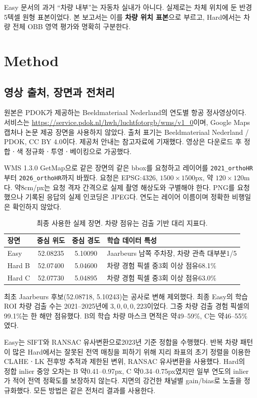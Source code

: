 \documentclass[11pt,a4paper]{article}
\begin{document}
Easy 문서의 과거 ``차량 내부''는 자동차 실내가 아니다. 실제로는 차체 위치에 둔 반경5텍셀 원형 표본이었다. 본 보고서는 이를 \textbf{차량 위치 표본}으로 부르고, Hard에서는 차량 전체 OBB 영역 평가와 명확히 구분한다.

\section{Method}
\subsection{영상 출처, 장면과 전처리}
원본은 PDOK가 제공하는 Beeldmateriaal Nederland의 연도별 항공 정사영상이다. 서비스는
\url{https://service.pdok.nl/hwh/luchtfotorgb/wms/v1_0}이며, Google Maps 캡처나 논문 제공 장면을 사용하지 않았다. 출처 표기는 Beeldmateriaal Nederland / PDOK, CC BY 4.0이다. 제공처 안내는 참고자료에 기재했다. 영상은 다운로드 후 정합ㆍ색 정규화ㆍ투영ㆍ베이킹으로 가공했다.

WMS 1.3.0 GetMap으로 같은 장면의 같은 bbox를 요청하고 레이어를 \texttt{2021\_orthoHR}부터 \texttt{2026\_orthoHR}까지 바꿨다. 요청은 EPSG:4326, $1500\times1500$px, 약 $120\times120$m다. 약8cm/px는 요청 격자 간격으로 실제 촬영 해상도와 구별해야 한다. PNG를 요청했으나 기록된 응답의 실제 인코딩은 JPEG다. 연도는 레이어 이름이며 정확한 비행일은 확인하지 않았다.

\begin{table}[htbp]\centering\small
\caption{최종 사용한 실제 장면. 차량 점유는 검출 기반 대리 지표다.}\label{tab:data}
\begin{tabular}{lccp{57mm}}
\toprule 장면 & 중심 위도 & 중심 경도 & 학습 데이터 특성\\\midrule
Easy & 52.08235 & 5.10090 & Jaarbeurs 남쪽 주차장, 차량 관측 대부분1/5\\
Hard B & 52.07400 & 5.04600 & 차량 경험 픽셀 중3회 이상 점유68.1\%\\
Hard C & 52.07730 & 5.04895 & 차량 경험 픽셀 중3회 이상 점유63.0\%\\\bottomrule
\end{tabular}\end{table}

최초 Jaarbeurs 후보(52.08718, 5.10243)는 공사로 변해 제외했다. 최종 Easy의 학습 ROI 차량 검출 수는 2021--2025년에 $3,0,0,0,223$이었다. 그중 차량 검출 경험 픽셀의 99.1\%는 한 해만 점유했다. B의 학습 차량 마스크 면적은 약49--59\%, C는 약46--55\%였다.

Easy는 SIFT와 RANSAC 유사변환으로2023년 기준 정합을 수행했다. 반복 차량 패턴이 많은 Hard에서는 잘못된 전역 매칭을 피하기 위해 지리 좌표의 초기 정렬을 이용한 CLAHEㆍLK 전후방 추적과 제한된 변위, RANSAC 유사변환을 사용했다. Hard의 정합 inlier 중앙 오차는 B 약0.41--0.97px, C 약0.34--0.75px였지만 일부 연도의 inlier가 적어 전역 정확도를 보장하지 않는다. 지면의 강건한 채널별 gain/bias로 노출을 정규화했다. 모든 방법은 같은 전처리 결과를 사용한다.
\end{document}
